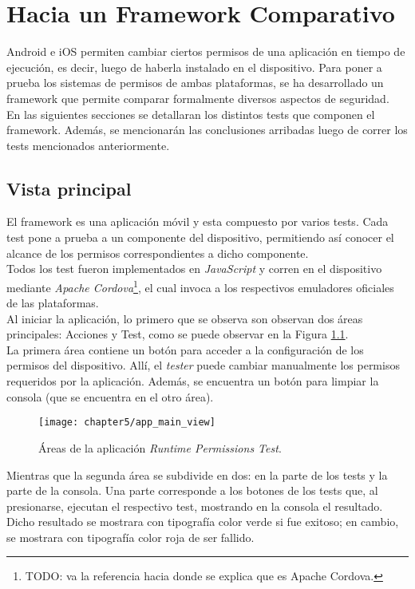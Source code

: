 \chapter{Hacia un Framework Comparativo}
Android e iOS permiten cambiar ciertos permisos de una aplicación en tiempo de ejecución, es decir, luego de haberla instalado en el dispositivo. Para poner a prueba los sistemas de permisos de ambas plataformas, se ha desarrollado un framework que permite comparar formalmente diversos aspectos de seguridad.\\
En las siguientes secciones se detallaran los distintos tests que componen el framework. Además, se mencionarán las conclusiones arribadas luego de correr los tests mencionados anteriormente.
\section{Vista principal} \label{sec:main-view}
El framework es una aplicación móvil y esta compuesto por varios tests. Cada test pone a prueba a un componente del dispositivo, permitiendo así conocer el alcance de los permisos correspondientes a dicho componente.\\
Todos los test fueron implementados en \emph{JavaScript} y corren en el dispositivo mediante \emph{Apache Cordova}\footnote{TODO: va la referencia hacia donde se explica que es Apache Cordova.}, el cual invoca a los respectivos emuladores oficiales de las plataformas.\\
Al iniciar la aplicación, lo primero que se observa son observan dos áreas principales: Acciones y Test, como se puede observar en la Figura \ref{fig:chapter05:main_view}.\\
La primera área contiene un botón para acceder a la configuración de los permisos del dispositivo. Allí, el \textit{tester} puede cambiar manualmente los permisos requeridos por la aplicación. Además, se encuentra un botón para limpiar la consola (que se encuentra en el otro área).\\
\begin{figure}[hbtp]
    \centering
	\texttt{[image: chapter5/app\_main\_view]}
	\caption{Áreas de la aplicación \textit{Runtime Permissions Test}.}
	\label{fig:chapter05:main_view}
\end{figure}
Mientras que la segunda área se subdivide en dos: en la parte de los tests y la parte de la consola. Una parte corresponde a los botones de los tests que, al presionarse, ejecutan el respectivo test, mostrando en la consola el resultado. Dicho resultado se mostrara con tipografía color verde si fue exitoso; en cambio, se mostrara con tipografía color roja de ser fallido.\\
